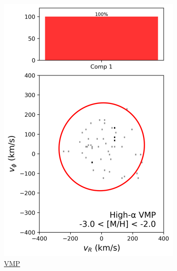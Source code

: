 \documentclass[a4paper,12pt]{article}
\begin{document}
\begin{figure}[H]
  \centering

  \begin{subfigure}{0.245\linewidth}
    \includegraphics[width=\linewidth]{../figures/gmm_vmp_high_alpha_k1.png}
    \caption{\href{https://raw.githack.com/raunaq-rai/Disentangling-the-Milky-Way-using-GMM/main/figures/VMP\_high\_\_\_-3\%5BM\_H\%5D-2.html}{VMP}}
    \label{fig:vmp_hi}
  \end{subfigure}\hfill
  \begin{subfigure}{0.245\linewidth}

\end{subfigure}
\end{figure}
\end{document}
